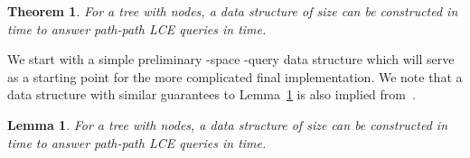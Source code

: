 \documentclass [10pt]{article}
\newtheorem{lemma}{Lemma}
\newtheorem{theorem}{Theorem}
\begin{document}
\begin{theorem}\label{thm:lcepp}
For a tree  with  nodes, a data structure of size  can be constructed in  time to answer path-path LCE queries in
 time. 
\end{theorem}

We start with a simple preliminary -space -query data structure which will serve as a starting point for the more complicated final implementation. We note that a data structure with similar guarantees to Lemma~\ref{lem:simple path-path} is also implied from~\cite{Bannai2013}.



\begin{lemma}
For a tree  with  nodes, a data structure of size  can be constructed in  time to answer path-path LCE queries in
 time.
\label{lem:simple path-path}
\end{lemma}
\end{document}
